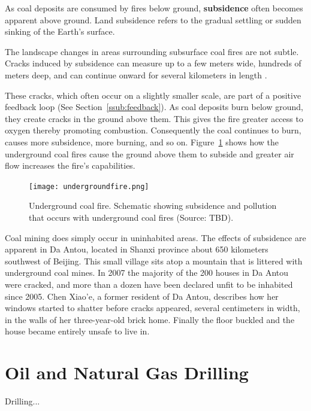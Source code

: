 As coal deposits are consumed by fires below ground, \textbf{subsidence} often becomes apparent above ground. Land subsidence refers to the gradual settling or sudden sinking of the Earth's surface. 

The landscape changes in areas surrounding subsurface coal fires are not subtle. Cracks induced by subsidence can measure up to a few meters wide, hundreds of meters deep, and can continue onward for several kilometers in length \citep{stracher2007coal}. %

These cracks, which often occur on a slightly smaller scale, are part of a positive feedback loop (See Section~\ref{ssub:feedback}). %
As coal deposits burn below ground, they create cracks in the ground above them. This gives the fire greater access to oxygen thereby promoting combustion. Consequently the coal continues to burn, causes more subsidence, more burning, and so on. Figure~\ref{fig:undergroundfire} shows how the underground coal fires cause the ground above them to subside and greater air flow increases the fire's capabilities. 


\begin{figure}[ht]
\centering
    \texttt{[image: undergroundfire.png]}
    \caption{Underground coal fire. Schematic showing subsidence and pollution that occurs with underground coal fires (Source: TBD). }
    \label{fig:undergroundfire}
\end{figure}

Coal mining does simply occur in uninhabited areas. The effects of subsidence are apparent in Da Antou, located in Shanxi province about 650 kilometers southwest of Beijing. This small village sits atop a mountain that is littered with underground coal mines. In 2007 the majority of the 200 houses in Da Antou were cracked, and more than a dozen have been declared unfit to be inhabited since 2005. Chen Xiao'e, a former resident of Da Antou, describes how her windows started to shatter before cracks appeared, several centimeters in width, in the walls of her three-year-old brick home. Finally the floor buckled and the house became entirely unsafe to live in. 

\section{Oil and Natural Gas Drilling}

Drilling...


